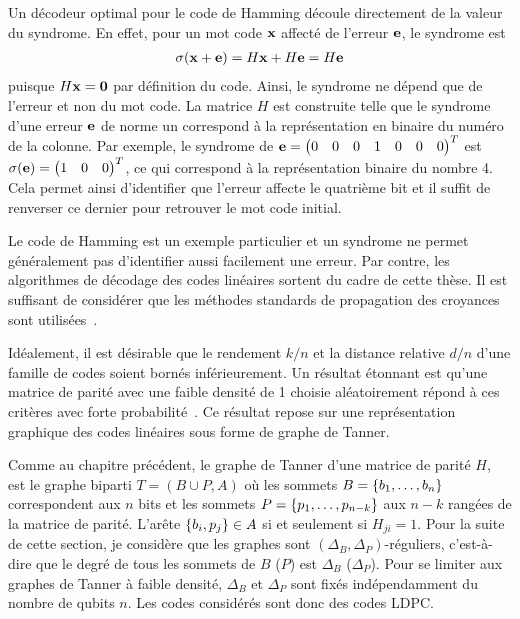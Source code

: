 Un décodeur optimal pour le code de Hamming découle directement de la valeur du syndrome.
En effet, pour un mot code $\vb x$ affecté de l'erreur $\vb e$,
le syndrome est 
\begin{align}
	\sigma(\vb x + \vb e) = H\vb x + H\vb e = H\vb e
\end{align}
puisque $H \vb x = \vb 0$ par définition du code.
Ainsi, le syndrome ne dépend que de l'erreur et non du mot code.
La matrice $H$ est construite telle que le syndrome d'une erreur $\vb e$ de norme un
correspond à la représentation en binaire du numéro de la colonne.
Par exemple,
le syndrome de $\vb e = \begin{pmatrix} 0 & 0 & 0 & 1 & 0 & 0 & 0 \end{pmatrix}^T$
est $\sigma(\vb e) = \begin{pmatrix} 1 & 0 & 0 \end{pmatrix}^T$,
ce qui correspond à la représentation binaire du nombre 4.
Cela permet ainsi d'identifier que l'erreur affecte le quatrième bit et 
il suffit de renverser ce dernier pour retrouver le mot code initial.

Le code de Hamming est un exemple particulier et un syndrome ne permet généralement
pas d'identifier aussi facilement une erreur.
Par contre,
les algorithmes de décodage des codes linéaires sortent du cadre de cette thèse.
Il est suffisant de considérer que les méthodes standards de propagation des 
croyances sont utilisées~\cite{richardson_modern_2008}.

Idéalement,
il est désirable que 
le rendement $k/n$ et la distance relative $d/n$ d'une famille de codes
soient bornés inférieurement.
Un résultat étonnant est qu'une matrice de parité avec une faible densité de 1
choisie aléatoirement répond à ces critères avec forte probabilité~\cite{sipser_expander_1996}.
Ce résultat repose sur une représentation graphique des codes linéaires sous forme de graphe de Tanner.

Comme au chapitre précédent,
le graphe de Tanner d'une matrice de parité $H$,
est le graphe biparti $T = (B \cup P, A)$
où les sommets $B = \qty{b_1, \ldots, b_n}$ correspondent aux $n$ bits
et les sommets $P = \qty{p_1, \ldots, p_{n - k}}$ aux $n - k$ rangées de la matrice de parité.
L'arête $\qty{b_i, p_j} \in A$ si et seulement si $H_{ji} = 1$.
Pour la suite de cette section,
je considère que les graphes sont $(\Delta_B, \Delta_P)$-réguliers,
c'est-à-dire que le degré de tous les sommets de $B$ ($P$) est $\Delta_B$ ($\Delta_P$).
Pour se limiter aux graphes de Tanner à faible densité,
$\Delta_B$ et $\Delta_P$ sont fixés indépendamment du nombre de qubits $n$.
Les codes considérés sont donc des codes LDPC.

